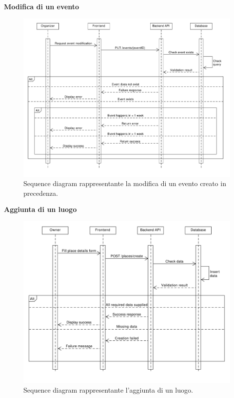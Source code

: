 \documentclass[9pt]{extarticle}
\begin{document}
\newpage
\textbf{Modifica di un evento}
\begin{figure}[!htb]
	\centering
	\includegraphics[width=\linewidth]{./images/SequenceDiagramEventModification.pdf}
	\caption{Sequence diagram rappresentante la modifica di un evento creato in precedenza.}
	\label{fig:SeqDiagEventModification}
\end{figure}

\newpage

\textbf{Aggiunta di un luogo}
\begin{figure}[!htb]
	\centering
	\includegraphics[width=\linewidth]{./images/SequenceDiagramAddPlace.pdf}
	\caption{Sequence diagram rappresentante l'aggiunta di un luogo.}
	\label{fig:SeqDiagAddPlace}
\end{figure}
\end{document}

